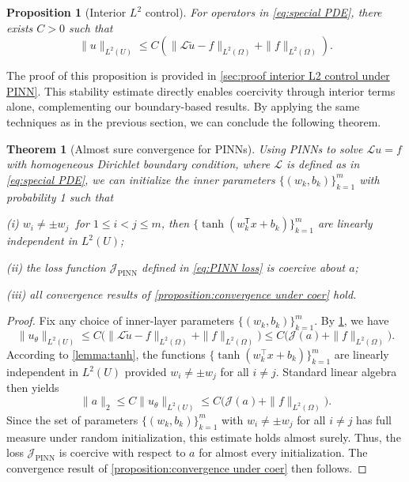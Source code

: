 \documentclass{article}
\newtheorem{theorem}{Theorem}
\newtheorem{proposition}{Proposition}
\newcommand{\T}{\mathsf{T}}
\begin{document}
\begin{proposition}[Interior $L^2$ control]\label{proposition:interior L2 control under PINN}  
For operators in \cref{eq:special PDE}, there exists $C>0$ such that
\begin{equation*}
\|u\|_{L^2(U)} \leq C(\|\mathcal{L}\tilde u-f\|_{L^2(\Omega)} + \|f\|_{L^2(\Omega)}).
\end{equation*}
\end{proposition}
The proof of this proposition is provided in \cref{sec:proof interior L2 control under PINN}.
This stability estimate directly enables coercivity through interior terms alone, complementing our boundary-based results.
By applying the same techniques as in the previous section,
we can conclude the following theorem.
\begin{theorem}[Almost sure convergence for PINNs]\label{theorem:convergence for PINN}
Using PINNs to solve $\mathcal{L}u=f$ with homogeneous Dirichlet boundary condition, where $\mathcal{L}$ is defined as in \cref{eq:special PDE}, we can initialize the inner parameters $\{(w_k,b_k)\}_{k=1}^{m}$ with probability 1 such that 
        
        (i) $w_{i}\neq \pm w_{j}\ $ for $1\le i<j\le m$, then $\{\tanh(w_k^\T x+b_k)\}_{k=1}^{m}$ are linearly independent in $L^{2}(U)$;
        
        (ii) the loss function $\mathcal{J}_{\text{PINN}}$ defined in \cref{eq:PINN loss} is coercive about $a$;
        
        (iii) all convergence results of \cref{proposition:convergence under coer} hold.
\end{theorem}
\begin{proof}
Fix any choice of inner-layer parameters $\{(w_k, b_k)\}_{k=1}^m$. By \cref{proposition:interior L2 control under PINN}, we have
\[
    \|u_{\theta}\|_{L^2(U)} \leq C \big( \|\mathcal{L}\tilde u - f\|_{L^2(\Omega)} + \|f\|_{L^2(\Omega)} \big) \leq C\big( \mathcal{J}(a) + \|f\|_{L^2(\Omega)} \big).
\]
According to \cref{lemma:tanh}, the functions $\{\tanh(w_k^\top x + b_k)\}_{k=1}^m$ are linearly independent in $L^2(U)$ provided $w_i \neq \pm w_j$ for all $i \neq j$. Standard linear algebra then yields
\[
    \|a\|_2 \leq C \|u_{\theta}\|_{L^2(U)} \leq C\big( \mathcal{J}(a) + \|f\|_{L^2(\Omega)} \big).
\]
Since the set of parameters $\{(w_k, b_k)\}_{k=1}^m$ with $w_i \neq \pm w_j$ for all $i \neq j$ has full measure under random initialization, this estimate holds almost surely. 
Thus, the loss $\mathcal{J}_{\mathrm{PINN}}$ is coercive with respect to $a$ for almost every initialization. The convergence result of \cref{proposition:convergence under coer} then follows.
\end{proof}
\end{document}
